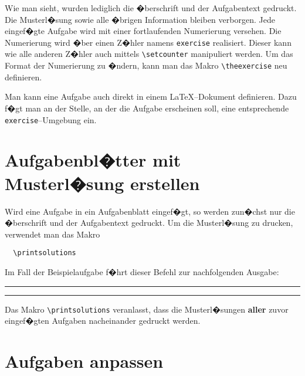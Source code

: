 \noindent
Wie man sieht, wurden lediglich die �berschrift und der Aufgabentext gedruckt. Die Musterl�sung sowie alle �brigen Information bleiben verborgen. Jede eingef�gte Aufgabe wird mit einer fortlaufenden Numerierung versehen. Die Numerierung wird �ber einen Z�hler namens \verb|exercise| realisiert. Dieser kann wie alle anderen Z�hler auch mittels \verb|\setcounter| manipuliert werden. Um das Format der Numerierung zu �ndern, kann man das Makro \verb|\theexercise| neu definieren. 

Man kann eine Aufgabe auch direkt in einem \LaTeX--Dokument definieren. Dazu f�gt man an der Stelle, an der die Aufgabe erscheinen soll, eine entsprechende \verb|exercise|--Umgebung ein.



\section{Aufgabenbl�tter mit Musterl�sung erstellen}

Wird eine Aufgabe in ein Aufgabenblatt eingef�gt, so werden zun�chst nur die �berschrift und der Aufgabentext gedruckt. Um die Musterl�sung zu drucken, verwendet man das Makro
\begin{verbatim}
  \printsolutions
\end{verbatim}
Im Fall der Beispielaufgabe f�hrt dieser Befehl zur nachfolgenden Ausgabe:

\vspace*{2em}
\hrule
\printsolutions
\hrule
\vspace*{2em}

\noindent
Das Makro \verb|\printsolutions| veranlasst, dass die Musterl�sungen \textbf{aller} zuvor eingef�gten Aufgaben nacheinander gedruckt werden.




\section{Aufgaben anpassen}

